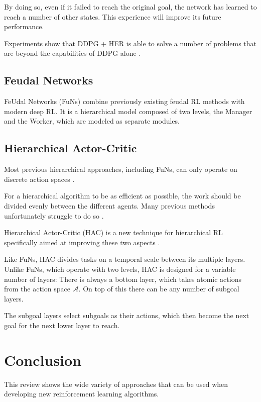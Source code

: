\documentclass[runningheads]{llncs}
\begin{document}
By doing so, even if it failed to reach the original goal, the network has learned to reach a number of other states. This experience will improve its future performance.

Experiments show that DDPG + HER is able to solve a number of problems that are beyond the capabilities of DDPG alone \cite{andrychowicz2017hindsight}.

\subsection{Feudal Networks}

FeUdal Networks (FuNs) \cite{vezhnevets2017feudal} combine previously existing feudal RL methods \cite{dayan1993feudal} with modern deep RL. It is a hierarchical model composed of two levels, the Manager and the Worker, which are modeled as separate modules. \todo{}

\subsection{Hierarchical Actor-Critic}

Most previous hierarchical approaches, including FuNs, can only operate on discrete action spaces \cite{levy2017hierarchical}.

For a hierarchical algorithm to be as efficient as possible, the work should be divided evenly between the different agents. Many previous methods unfortunately struggle to do so \cite{levy2017hierarchical}.

Hierarchical Actor-Critic (HAC) is a new technique for hierarchical RL specifically aimed at improving these two aspects \cite{levy2017hierarchical}.

Like FuNs, HAC divides tasks on a temporal scale between its multiple layers. Unlike FuNs, which operate with two levels, HAC is designed for a variable number of layers: There is always a bottom layer, which takes atomic actions from the action space $\mathcal{A}$. On top of this there can be any number of subgoal layers.

The subgoal layers select subgoals as their actions, which then become the next goal for the next lower layer to reach.

\section{Conclusion}

This review shows the wide variety of approaches that can be used when developing new reinforcement learning algorithms.
\end{document}
